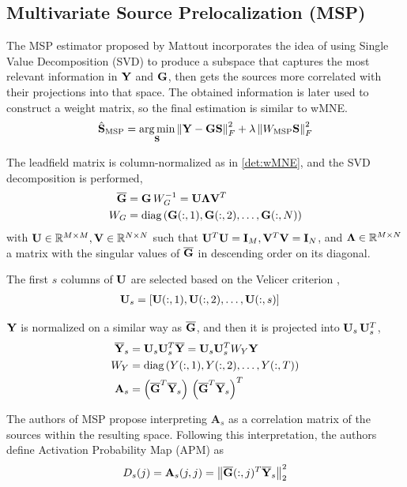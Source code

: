 \subsection{Multivariate Source Prelocalization (MSP)}

The MSP estimator proposed by Mattout \cite{mattout2005multivariate} incorporates the idea of using Single Value Decomposition (SVD) to produce a subspace that captures the most relevant information in $\mathbf{Y}$ and $\mathbf{G}$, then gets the sources more correlated with their projections into that space.
%
The obtained information is later used to construct a weight matrix, so the final estimation is similar to wMNE.
\begin{equation}
\hat{\mathbf{S}}_\text{MSP} = \operatorname*{arg\,min}_{\mathbf{S}} \left\lVert \mathbf{Y} - \mathbf{G} \mathbf{S} \right\rVert_F^2 + \lambda\left\lVert W_\text{MSP} \mathbf{S} \right\rVert_F^2
\end{equation}

The leadfield matrix is column-normalized as in \ref{det:wMNE}, and the SVD decomposition is performed, 
\begin{align}
\overline{\mathbf{G}} &=  \mathbf{G}\, W_G^{-1} = \mathbf{U} \mathbf{\Lambda} \mathbf{V}^T
\\
W_G &= \text{diag}\left(   \mathbf{G}(:,1), \mathbf{G}(:,2), \dots, \mathbf{G}(:,N)   \right)
\end{align}
with $\mathbf{U}\in \mathbb{R}^{M\times M},\mathbf{V}\in \mathbb{R}^{N\times N}$ such that $\mathbf{U}^T \mathbf{U} = \mathbf{I}_M, \mathbf{V}^T\mathbf{V} = \mathbf{I}_N$, and $\mathbf{\Lambda} \in \mathbb{R}^{M\times N}$ a matrix with the singular values of $\overline{\mathbf{G}}$ in descending order on its diagonal.

The first $s$ columns of $\mathbf{U}$ are selected based on the Velicer criterion \cite{velicer1996criterion},
\begin{align}
\mathbf{U}_s 
&= 
\left[  \mathbf{U}(:,1), \mathbf{U}(:,2), \dots, \mathbf{U}(:,s)  \right]
\end{align}

$\mathbf{Y}$ is normalized on a similar way as $\overline{\mathbf{G}}$, and then it is projected into $\mathbf{U}_s\, \mathbf{U}_s^T$,
\begin{align}
\overline{\mathbf{Y}}_s 
&=
\mathbf{U}_s \mathbf{U}_s^T \overline{\mathbf{Y}} = \mathbf{U}_s \mathbf{U}_s^T W_Y \mathbf{Y}
\\
W_Y &= \text{diag}\left(   Y(:,1), Y(:,2), \dots, Y(:,T)   \right)
\\
\mathbf{A}_s &= \left( \overline{\mathbf{G}}^T \overline{\mathbf{Y}}_s \right)\, \left( \overline{\mathbf{G}}^T \overline{\mathbf{Y}}_s \right)^T
\end{align}

The authors of MSP propose interpreting $\mathbf{A}_s$ as a correlation matrix of the sources within the resulting space.
%
Following this interpretation, the authors define {Activation Probability Map} (APM) as
\begin{align}
{D}_s(j) = \mathbf{A}_s(j,j) = \left\lVert \overline{\mathbf{G}}(:,j)^T \overline{\mathbf{Y}}_s   \right\rVert_2^2
\end{align}


